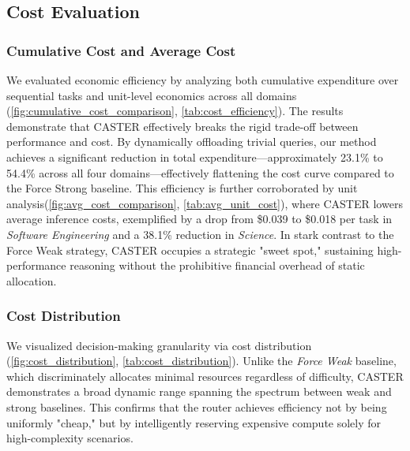 \documentclass{article}
\theoremstyle{plain}
\theoremstyle{definition}
\theoremstyle{remark}
\begin{document}
\subsection{Cost Evaluation} 

\subsubsection{Cumulative Cost and Average Cost} 

We evaluated economic efficiency by analyzing both cumulative expenditure over sequential tasks and unit-level economics across all domains (\cref{fig:cumulative_cost_comparison}, \cref{tab:cost_efficiency}). The results demonstrate that CASTER effectively breaks the rigid trade-off between performance and cost. By dynamically offloading trivial queries, our method achieves a significant reduction in total expenditure—approximately 23.1\% to 54.4\% across all four domains—effectively flattening the cost curve compared to the Force Strong baseline. This efficiency is further corroborated by unit analysis(\cref{fig:avg_cost_comparison}, \cref{tab:avg_unit_cost}), where CASTER lowers average inference costs, exemplified by a drop from \$0.039 to \$0.018 per task in \textit{Software Engineering} and a 38.1\% reduction in \textit{Science}. In stark contrast to the Force Weak strategy, CASTER occupies a strategic "sweet spot," sustaining high-performance reasoning without the prohibitive financial overhead of static allocation.

\subsubsection{Cost Distribution} We visualized decision-making granularity via cost distribution (\cref{fig:cost_distribution}, \cref{tab:cost_distribution}). Unlike the \textit{Force Weak} baseline, which discriminately allocates minimal resources regardless of difficulty, CASTER demonstrates a broad dynamic range spanning the spectrum between weak and strong baselines. This confirms that the router achieves efficiency not by being uniformly "cheap," but by intelligently reserving expensive compute solely for high-complexity scenarios.
\end{document}
